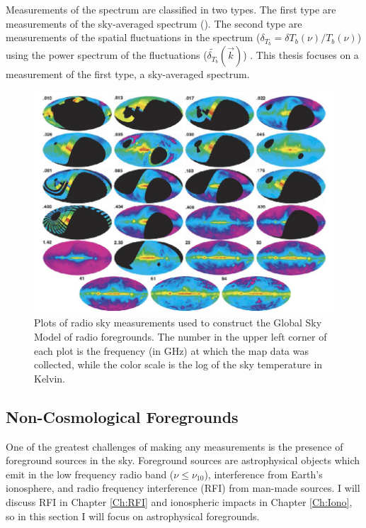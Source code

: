 Measurements of the \cm spectrum are classified in two types. The first type are measurements of the sky-averaged spectrum (\avgdtb). The second type are measurements of the spatial fluctuations in the \cm spectrum ($\delta_{T_b} =  \delta T_b (\nu)/ T_b (\nu)$) using the power spectrum of the fluctuations ($ \tilde{ \delta_{T_b} } ( \vec{k} )$) \cite{natarajan_2014}. This thesis focuses on a measurement of the first type, a sky-averaged spectrum. 

\begin{figure}[htb]
\begin{center}
\includegraphics[width=0.95\linewidth]{Introduction/figures/GSM_maps.jpg}
\caption{Plots of radio sky measurements used to construct the Global Sky Model \cite{GSM_model} of radio foregrounds. The number in the upper left corner of each plot is the frequency (in GHz) at which the map data was collected, while the color scale is the log of the sky temperature in Kelvin.}
\label{Fig:GSM_maps}
\end{center}
\end{figure}


\subsection{Non-Cosmological Foregrounds} \label{Sec:gsm_fore}

One of the greatest challenges of making any \cm measurements is the presence of foreground sources in the sky. Foreground sources are astrophysical objects which emit in the low frequency radio band ($\nu \leq \nu_{10}$), interference from Earth's ionosphere, and radio frequency interference (RFI) from man-made sources. I will discuss RFI in Chapter \ref{Ch:RFI} and ionospheric impacts in Chapter \ref{Ch:Iono}, so in this section I will focus on astrophysical foregrounds. 

